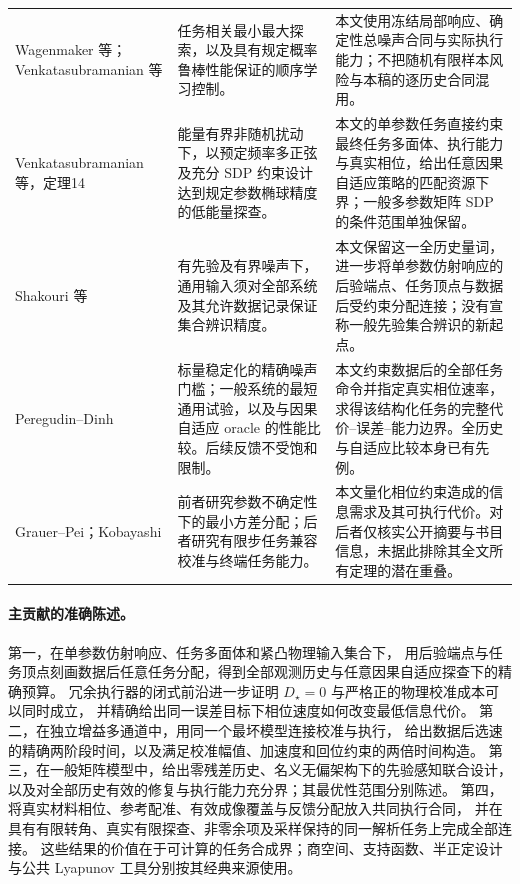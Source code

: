 \documentclass[11pt,a4paper]{article}
\numberwithin{equation}{section}
\theoremstyle{definition}
\begin{document}
\begin{center}
\begin{longtable}{p{.21\linewidth}p{.345\linewidth}p{.345\linewidth}}
Wagenmaker 等\cite{wagenmaker2021}；Venkata\-subramanian 等\cite{venkata2024}
& 任务相关最小最大探索，以及具有规定概率鲁棒性能保证的顺序学习控制。
& 本文使用冻结局部响应、确定性总噪声合同与实际执行能力；不把随机有限样本风险与本稿的逐历史合同混用。\\
Venkata\-subramanian 等\cite{venkata2025robust}，定理14
& 能量有界非随机扰动下，以预定频率多正弦及充分 SDP 约束设计达到规定参数椭球精度的低能量探查。
& 本文的单参数任务直接约束最终任务多面体、执行能力与真实相位，给出任意因果自适应策略的匹配资源下界；一般多参数矩阵 SDP 的条件范围单独保留。\\
Shakouri 等\cite{shakouri2026}
& 有先验及有界噪声下，通用输入须对全部系统及其允许数据记录保证集合辨识精度。
& 本文保留这一全历史量词，进一步将单参数仿射响应的后验端点、任务顶点与数据后受约束分配连接；没有宣称一般先验集合辨识的新起点。\\
Peregudin--Dinh\cite{peregudin2026scalar,peregudin2026minimal}
& 标量稳定化的精确噪声门槛；一般系统的最短通用试验，以及与因果自适应 oracle 的性能比较。后续反馈不受饱和限制。
& 本文约束数据后的全部任务命令并指定真实相位速率，求得该结构化任务的完整代价--误差--能力边界。全历史与自适应比较本身已有先例。\\
Grauer--Pei\cite{grauer2022}；Kobayashi\cite{kobayashi2026}
& 前者研究参数不确定性下的最小方差分配；后者研究有限步任务兼容校准与终端任务能力。
& 本文量化相位约束造成的信息需求及其可执行代价。对后者仅核实公开摘要与书目信息，未据此排除其全文所有定理的潜在重叠。\\
\end{longtable}
\end{center}

\paragraph{主贡献的准确陈述。}
第一，在单参数仿射响应、任务多面体和紧凸物理输入集合下，
用后验端点与任务顶点刻画数据后任意任务分配，得到全部观测历史与任意因果自适应探查下的精确预算。
冗余执行器的闭式前沿进一步证明 $D_\star=0$ 与严格正的物理校准成本可以同时成立，
并精确给出同一误差目标下相位速度如何改变最低信息代价。
第二，在独立增益多通道中，用同一个最坏模型连接校准与执行，
给出数据后选速的精确两阶段时间，以及满足校准幅值、加速度和回位约束的两倍时间构造。
第三，在一般矩阵模型中，给出零残差历史、名义无偏架构下的先验感知联合设计，
以及对全部历史有效的修复与执行能力充分界；其最优性范围分别陈述。
第四，将真实材料相位、参考配准、有效成像覆盖与反馈分配放入共同执行合同，
并在具有有限转角、真实有限探查、非零余项及采样保持的同一解析任务上完成全部连接。
这些结果的价值在于可计算的任务合成界；商空间、支持函数、半正定设计与公共 Lyapunov 工具分别按其经典来源使用。
\end{document}
